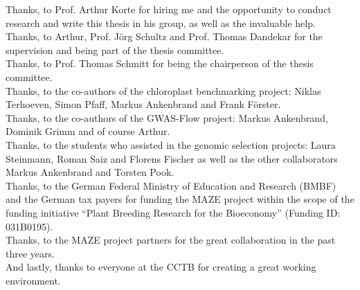 \documentclass[
12pt, %
english, %
doublespacing, %
headsepline, %
chapterinoneline, %
]{MastersDoctoralThesis} %
\begin{document}

\begin{acknowledgements}
   \noindent
   Thanks, to Prof. Arthur Korte for hiring me and the opportunity to conduct research and write this thesis in his group, as well as the invaluable help. \\
   Thanks, to Arthur, Prof. Jörg Schultz and Prof. Thomas Dandekar for the supervision and being part of the thesis committee. \\
   Thanks, to Prof. Thomas Schmitt for being the chairperson of the thesis committee. \\
   Thanks, to the co-authors of the chloroplast benchmarking project: Niklas Terhoeven, Simon Pfaff, Markus Ankenbrand and Frank Förster. \\
   Thanks, to the co-authors of the GWAS-Flow project: Markus Ankenbrand, Dominik Grimm and of course Arthur. \\
   Thanks, to the students who assisted in the genomic selection projects: Laura Steinmann, Roman Saiz and Florens Fischer as well as the other collaborators Markus Ankenbrand and Torsten Pook. \\
   Thanks, to the German Federal Ministry of Education and Research (BMBF) and the German
   tax payers for funding the MAZE project within the scope of the funding initiative
   “Plant Breeding Research for the Bioeconomy” (Funding ID: 031B0195). \\
   Thanks, to the MAZE project partners for the great collaboration in the past three years. \\
   And lastly, thanks to everyone at the CCTB for creating a great working environment. \\
\end{acknowledgements}




\end{document}
